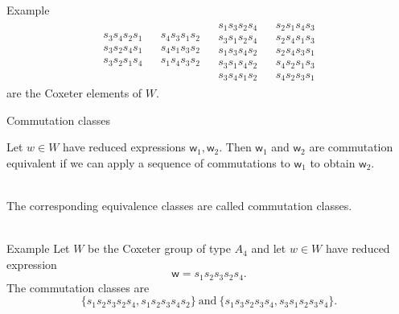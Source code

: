 \documentclass[9pt,handout]{beamer}
\newcommand{\w}{{\textsf{w}}}
\begin{document}
\begin{frame}
\begin{block}{Example}
$${\begin{array}{cccc}
    \boxed{\begin{array}{c} \\ s_3s_4s_2s_1 \\ s_3s_2s_4s_1 \\ s_3s_2s_1s_4 \\ \\ \end{array}} & 
    \boxed{\begin{array}{c} \\ s_4s_3s_1s_2 \\ s_4s_1s_3s_2 \\ s_1s_4s_3s_2 \\ \\ \end{array}} &
    \boxed{\begin{array}{c} s_1s_3s_2s_4 \\ s_3s_1s_2s_4 \\ s_1s_3s_4s_2 \\ s_3s_1s_4s_2 \\ s_3s_4s_1s_2 \end{array}} &
    \boxed{\begin{array}{c} s_2s_1s_4s_3 \\ s_2s_4s_1s_3 \\ s_2s_4s_3s_1 \\   s_4s_2s_1s_3 \\ s_4s_2s_3s_1 \end{array}}
\end{array}}$$
    are the Coxeter elements of $W$.
\end{block}
\end{frame}

\begin{frame}{Commutation classes}
\begin{definition} Let $w \in W$ have reduced expressions $\w_1,\w_2$. Then $\w_1$ and $\w_2$ are \alert{commutation equivalent} if we can apply a sequence of commutations to $\w_1$ to obtain $\w_2$.
\end{definition} ~\\

    The corresponding equivalence classes are called \alert{commutation classes}. \\~\\ \pause

\begin{block}{Example} Let $W$ be the Coxeter group of type $A_4$ and let $w \in W$ have reduced expression $$\w = s_1 s_2 s_3 s_2 s_4.$$ %
    The commutation classes are $$\{s_1s_2s_3s_2s_4, s_1s_2s_3s_4s_2\} ~\text{and}~ \{s_1s_3s_2s_3s_4, s_3s_1s_2s_3s_4\}.$$
\end{block}
\end{frame}
\end{document}

